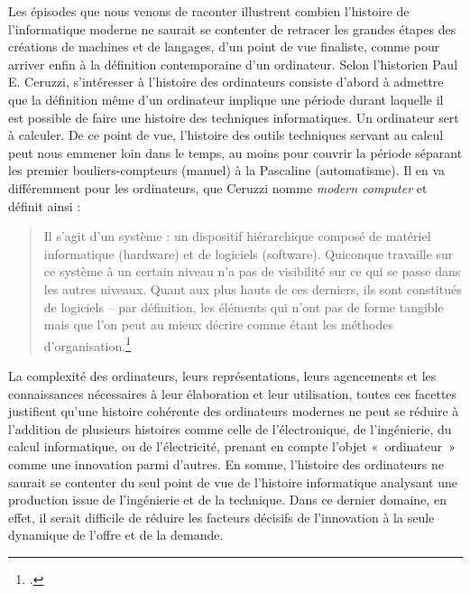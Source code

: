 \documentclass{FramateX}
\begin{document}
\begin{refsection}
Les épisodes que nous venons de raconter illustrent combien
l'histoire de l'informatique moderne
ne saurait se contenter de retracer les grandes étapes des créations de
machines et de langages, d'un point de vue finaliste,
comme pour arriver enfin à la définition contemporaine
d'un ordinateur. Selon l'historien
Paul E. Ceruzzi, s'intéresser à
l'histoire des ordinateurs consiste
d'abord à admettre que la définition même
d'un ordinateur implique une période durant laquelle
il est possible de faire une histoire des techniques informatiques. Un
ordinateur sert à calculer. De ce point de vue,
l'histoire des outils techniques servant au calcul
peut nous emmener loin dans le temps, au moins pour couvrir la période
séparant les premier bouliers-compteurs (manuel) à la Pascaline
(automatisme). Il en va différemment pour les ordinateurs, que Ceruzzi
nomme \textit{modern computer} et définit ainsi : 

\begin{quote}
Il
s'agit d'un système : un dispositif
hiérarchique composé de matériel informatique (hardware) et de
logiciels (software). Quiconque travaille sur ce système à un certain
niveau n'a pas de visibilité sur ce qui se passe dans
les autres niveaux. Quant aux plus hauts de ces derniers, ils sont
constitués de logiciels -- par définition, les éléments qui
n'ont pas de forme tangible mais que
l'on peut au mieux décrire comme étant les méthodes
d'organisation.\footnote{\cite[p.~4]{ceruzzihistory1998}.}
\end{quote}

La complexité des ordinateurs, leurs représentations, leurs agencements
et les connaissances nécessaires à leur élaboration et leur
utilisation, toutes ces facettes justifient qu'une
histoire cohérente des ordinateurs modernes ne peut se réduire à
l'addition de plusieurs histoires comme celle de
l'électronique, de l'ingénierie, du
calcul informatique, ou de l'électricité, prenant en
compte l'objet «~ordinateur~» comme une innovation
parmi d'autres. En somme, l'histoire
des ordinateurs ne saurait se contenter du seul point de vue de
l'histoire informatique analysant une production issue
de l'ingénierie et de la technique. Dans ce dernier
domaine, en effet, il serait difficile de réduire les facteurs décisifs
de l'innovation à la seule dynamique de
l'offre et de la demande.


\end{refsection}
\end{document}
